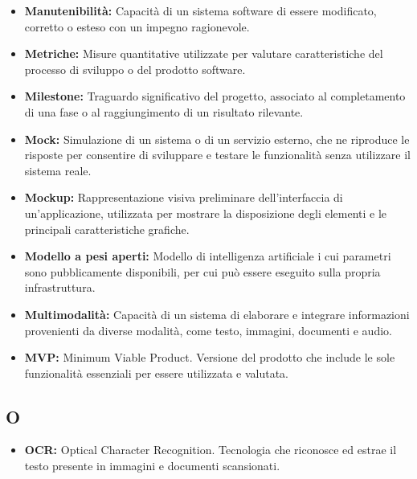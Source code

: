 \begin{itemize}
    \item \textbf{Manutenibilità:} Capacità di un sistema software di essere modificato, corretto o esteso con un impegno ragionevole.
    \item \textbf{Metriche:} Misure quantitative utilizzate per valutare caratteristiche del processo di sviluppo o del prodotto software.
    \item \textbf{Milestone:} Traguardo significativo del progetto, associato al completamento di una fase o al raggiungimento di un risultato rilevante.
    \item \textbf{Mock:} Simulazione di un sistema o di un servizio esterno, che ne riproduce le risposte per consentire di sviluppare e testare le funzionalità senza utilizzare il sistema reale.
    \item \textbf{Mockup:} Rappresentazione visiva preliminare dell'interfaccia di un'applicazione, utilizzata per mostrare la disposizione degli elementi e le principali caratteristiche grafiche.
    \item \textbf{Modello a pesi aperti:} Modello di intelligenza artificiale i cui parametri sono pubblicamente disponibili, per cui può essere eseguito sulla propria infrastruttura.
    \item \textbf{Multimodalità:} Capacità di un sistema di elaborare e integrare informazioni provenienti da diverse modalità, come testo, immagini, documenti e audio.
    \item \textbf{MVP:} Minimum Viable Product. Versione del prodotto che include le sole funzionalità essenziali per essere utilizzata e valutata.
\end{itemize}



{}
\subsection*{O}

\begin{itemize}
    \item \textbf{OCR:} Optical Character Recognition. Tecnologia che riconosce ed estrae il testo presente in immagini e documenti scansionati.
\end{itemize}


